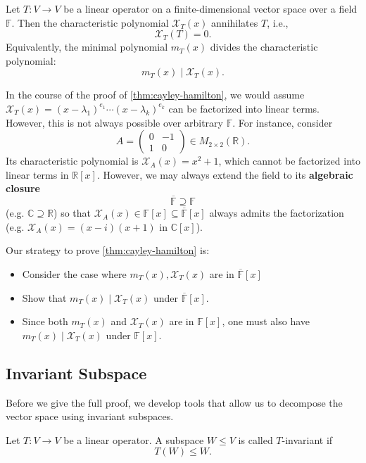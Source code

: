 \begin{theorem}\label{thm:cayley-hamilton}
Let \( T : V \to V \) be a linear operator on a finite-dimensional vector space over a field \( \mathbb{F} \). Then the characteristic polynomial \( \mathcal{X}_T(x) \) annihilates \( T \), i.e.,
\[
\mathcal{X}_T(T) = 0.
\]
Equivalently, the minimal polynomial \( m_T(x) \) divides the characteristic polynomial:
\[
m_T(x) \mid \mathcal{X}_T(x).
\]
\end{theorem}

In the course of the proof of \autoref{thm:cayley-hamilton}, we would assume 
$\mathcal{X}_T(x) = (x - \lambda_1)^{e_1} \cdots (x-\lambda_k)^{e_k}$
can be factorized into linear terms. However, this is not always possible over arbitrary \( \mathbb{F} \). For instance, consider
\[
A = \begin{pmatrix} 0 & -1 \\ 1 & 0 \end{pmatrix} \in M_{2 \times 2}(\mathbb{R}).
\]
Its characteristic polynomial is \( \mathcal{X}_A(x) = x^2 + 1 \), which cannot be factorized into linear terms in \( \mathbb{R}[x] \). However, we may always extend the field to its {\bf algebraic closure} 
\[ \overline{\mathbb{F}} \supseteq \mathbb{F} \] (e.g. $\mathbb{C} \supseteq \mathbb{R}$) so that \( \mathcal{X}_A(x) \in \mathbb{F}[x] \subseteq \overline{\mathbb{F}}[x]\) always admits the factorization (e.g. $\mathcal{X}_A(x) = (x - i)(x +1)$ in $\mathbb{C}[x]$).

Our strategy to prove \autoref{thm:cayley-hamilton} is:
\begin{itemize}
    \item Consider the case where \( m_T(x), \mathcal{X}_T(x)\) are in \(\overline{\mathbb{F}}[x]\) 
    \item Show that \(m_T(x) \mid \mathcal{X}_T(x)\) under \(\overline{\mathbb{F}}[x]\).
    \item Since both \(m_T(x)\) and \(\mathcal{X}_T(x)\) are in $\mathbb{F}[x]$, one must also have \(m_T(x) \mid \mathcal{X}_T(x)\) under \(\mathbb{F}[x]\).
\end{itemize}

\subsection{Invariant Subspace}
Before we give the full proof, we develop tools that allow us to decompose the vector space using invariant subspaces.
\begin{definition}\label{def:invariant-subspace}
Let \( T : V \to V \) be a linear operator. A subspace \( W \leq V \) is called \( T \)-invariant if
\[
T(W) \leq W.
\]
\end{definition}

